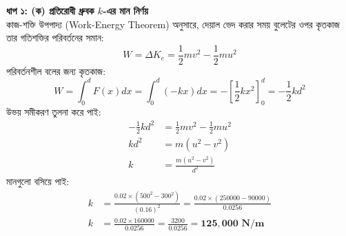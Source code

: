 \documentclass[12pt, a4paper]{article}
\begin{document}
\begin{tcolorbox}[solutionbox={সমাধান (Solution)}]
\begin{center}
\end{center}
\vspace{1em}

\noindent
\textbf{ধাপ ১: (ক) প্রতিরোধী ধ্রুবক $k$-এর মান নির্ণয়} \\
কাজ-শক্তি উপপাদ্য (Work-Energy Theorem) অনুসারে, দেয়াল ভেদ করার সময় বুলেটের ওপর কৃতকাজ তার গতিশক্তির পরিবর্তনের সমান:
\[ W = \Delta K_e = \frac{1}{2} m v^2 - \frac{1}{2} m u^2 \]
পরিবর্তনশীল বলের জন্য কৃতকাজ:
\[ W = \int_{0}^{d} F(x) dx = \int_{0}^{d} (-k x) dx = -\left[ \frac{1}{2} k x^2 \right]_0^d = -\frac{1}{2} k d^2 \]
উভয় সমীকরণ তুলনা করে পাই:
\begin{align*}
    -\frac{1}{2} k d^2 &= \frac{1}{2} m v^2 - \frac{1}{2} m u^2 \\
    k d^2 &= m(u^2 - v^2) \\
    k &= \frac{m(u^2 - v^2)}{d^2}
\end{align*}
মানগুলো বসিয়ে পাই:
\begin{align*}
    k &= \frac{0.02 \times (500^2 - 300^2)}{(0.16)^2} = \frac{0.02 \times (250000 - 90000)}{0.0256} \\
    k &= \frac{0.02 \times 160000}{0.0256} = \frac{3200}{0.0256} = \mathbf{125,000 \text{ N/m}}
\end{align*}


\end{tcolorbox}
\end{document}

